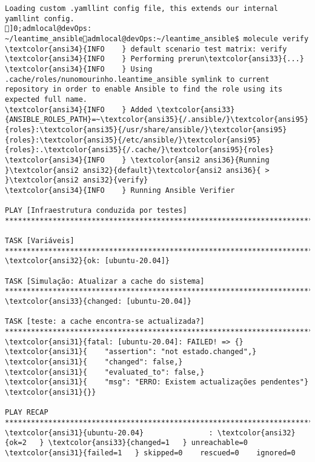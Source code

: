 \documentclass{scrartcl}
\begin{document}
\begin{Verbatim}
Loading custom .yamllint config file, this extends our internal yamllint config.
]0;admlocal@devOps: ~/leantime_ansibleadmlocal@devOps:~/leantime_ansible$ molecule verify
\textcolor{ansi34}{INFO    } default scenario test matrix: verify
\textcolor{ansi34}{INFO    } Performing prerun\textcolor{ansi33}{...}
\textcolor{ansi34}{INFO    } Using .cache/roles/nunomourinho.leantime_ansible symlink to current repository in order to enable Ansible to find the role using its expected full name.
\textcolor{ansi34}{INFO    } Added \textcolor{ansi33}{ANSIBLE_ROLES_PATH}=~\textcolor{ansi35}{/.ansible/}\textcolor{ansi95}{roles}:\textcolor{ansi35}{/usr/share/ansible/}\textcolor{ansi95}{roles}:\textcolor{ansi35}{/etc/ansible/}\textcolor{ansi95}{roles}:.\textcolor{ansi35}{/.cache/}\textcolor{ansi95}{roles}
\textcolor{ansi34}{INFO    } \textcolor{ansi2 ansi36}{Running }\textcolor{ansi2 ansi32}{default}\textcolor{ansi2 ansi36}{ > }\textcolor{ansi2 ansi32}{verify}
\textcolor{ansi34}{INFO    } Running Ansible Verifier

PLAY [Infraestrutura conduzida por testes] ***********************************************************************************************

TASK [Variáveis] *************************************************************************************************************************
\textcolor{ansi32}{ok: [ubuntu-20.04]}

TASK [Simulação: Atualizar a cache do sistema] *******************************************************************************************
\textcolor{ansi33}{changed: [ubuntu-20.04]}

TASK [teste: a cache encontra-se actualizada?] *******************************************************************************************
\textcolor{ansi31}{fatal: [ubuntu-20.04]: FAILED! => {}
\textcolor{ansi31}{    "assertion": "not estado.changed",}
\textcolor{ansi31}{    "changed": false,}
\textcolor{ansi31}{    "evaluated_to": false,}
\textcolor{ansi31}{    "msg": "ERRO: Existem actualizações pendentes"}
\textcolor{ansi31}{}}

PLAY RECAP *******************************************************************************************************************************
\textcolor{ansi31}{ubuntu-20.04}               : \textcolor{ansi32}{ok=2   } \textcolor{ansi33}{changed=1   } unreachable=0    \textcolor{ansi31}{failed=1   } skipped=0    rescued=0    ignored=0



\end{Verbatim}
\end{document}
